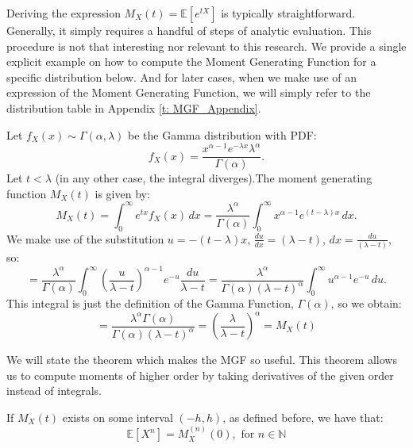 \begin{remark}
    Deriving the expression \(M_X(t) = \mathbb{E}[e^{tX}]\) is typically straightforward. Generally, it simply requires a handful of steps of analytic evaluation. This procedure is not that interesting nor relevant to this research. We provide a single explicit example on how to compute the Moment Generating Function for a specific distribution below. And for later cases, when we make use of an expression of the Moment Generating Function, we will simply refer to the distribution table in Appendix \ref{t: MGF_Appendix}.
\end{remark}

\begin{example}
    Let \(f_X(x) \sim \Gamma(\alpha, \lambda)\) be the Gamma distribution with PDF:
     \[
     f_X(x) = \frac{x^{\alpha -1} e^{-\lambda x} \lambda^\alpha}{\Gamma(\alpha)}.
     \]
     Let \( t < \lambda\) (in any other case, the integral diverges).The moment generating function \(M_X(t)\) is given by:
     \[
     M_X(t) = \int_{0}^{\infty} e^{tx} f_X(x) \, dx = \frac{\lambda^\alpha}{\Gamma(\alpha)} \int_{0}^{\infty} x^{\alpha -1} e^{(t - \lambda) x} \, dx.
     \]
     We make use of the substitution \(u = -(t - \lambda)x\), \(\frac{du}{dx} = (\lambda - t)\), \(dx = \frac{du}{(\lambda - t)}\), so:
     \[
     = \frac{\lambda^\alpha}{\Gamma(\alpha)} \int_{0}^{\infty} \left(\frac{u}{\lambda - t}\right)^{\alpha -1} e^{-u} \frac{du}{\lambda - t} = \frac{\lambda^\alpha}{\Gamma(\alpha) (\lambda - t)^\alpha} \int_{0}^{\infty} u^{\alpha -1} e^{-u} \, du.
     \] This integral is just the definition of the Gamma Function, \(\Gamma(\alpha)\), so we obtain:
     \[ = \frac{\lambda^\alpha \Gamma(\alpha)}{\Gamma(\alpha) (\lambda - t)^\alpha} = \left(\frac{\lambda}{\lambda - t}\right)^\alpha = M_X(t)\]
 \end{example}
 
We will state the theorem which makes the MGF so useful. This theorem allows us to compute moments of higher order by taking derivatives of the given order instead of integrals.
\begin{theorem}\label{t: mgf}
    If \(M_X(t)\) exists on some interval \((-h, h)\), as defined before, we have that:
    \[ \mathbb{E}[X^n] = M_X^{(n)}(0), \text{ for } n \in \mathbb{N}\]
\end{theorem}

